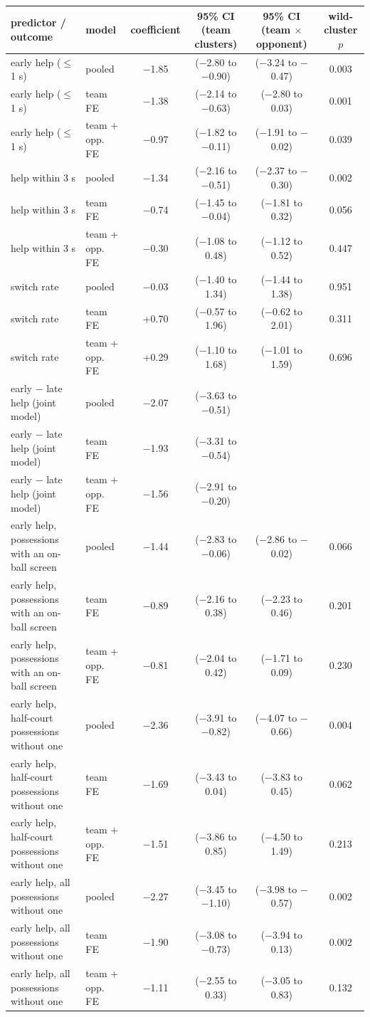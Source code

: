 \begin{tabular}{llcccc}
\hline
predictor / outcome & model & coefficient & 95\% CI (team clusters) & 95\% CI (team $\times$ opponent) & wild-cluster $p$ \\
\hline
early help ($\leq$ 1 s) & pooled & $-$1.85 & ($-$2.80 to $-$0.90) & ($-$3.24 to $-$0.47) & 0.003 \\
early help ($\leq$ 1 s) & team FE & $-$1.38 & ($-$2.14 to $-$0.63) & ($-$2.80 to 0.03) & 0.001 \\
early help ($\leq$ 1 s) & team + opp. FE & $-$0.97 & ($-$1.82 to $-$0.11) & ($-$1.91 to $-$0.02) & 0.039 \\
help within 3 s & pooled & $-$1.34 & ($-$2.16 to $-$0.51) & ($-$2.37 to $-$0.30) & 0.002 \\
help within 3 s & team FE & $-$0.74 & ($-$1.45 to $-$0.04) & ($-$1.81 to 0.32) & 0.056 \\
help within 3 s & team + opp. FE & $-$0.30 & ($-$1.08 to 0.48) & ($-$1.12 to 0.52) & 0.447 \\
switch rate & pooled & $-$0.03 & ($-$1.40 to 1.34) & ($-$1.44 to 1.38) & 0.951 \\
switch rate & team FE & +0.70 & ($-$0.57 to 1.96) & ($-$0.62 to 2.01) & 0.311 \\
switch rate & team + opp. FE & +0.29 & ($-$1.10 to 1.68) & ($-$1.01 to 1.59) & 0.696 \\
early $-$ late help (joint model) & pooled & $-$2.07 & ($-$3.63 to $-$0.51) & &  \\
early $-$ late help (joint model) & team FE & $-$1.93 & ($-$3.31 to $-$0.54) & &  \\
early $-$ late help (joint model) & team + opp. FE & $-$1.56 & ($-$2.91 to $-$0.20) & &  \\
early help, possessions with an on-ball screen & pooled & $-$1.44 & ($-$2.83 to $-$0.06) & ($-$2.86 to $-$0.02) & 0.066 \\
early help, possessions with an on-ball screen & team FE & $-$0.89 & ($-$2.16 to 0.38) & ($-$2.23 to 0.46) & 0.201 \\
early help, possessions with an on-ball screen & team + opp. FE & $-$0.81 & ($-$2.04 to 0.42) & ($-$1.71 to 0.09) & 0.230 \\
early help, half-court possessions without one & pooled & $-$2.36 & ($-$3.91 to $-$0.82) & ($-$4.07 to $-$0.66) & 0.004 \\
early help, half-court possessions without one & team FE & $-$1.69 & ($-$3.43 to 0.04) & ($-$3.83 to 0.45) & 0.062 \\
early help, half-court possessions without one & team + opp. FE & $-$1.51 & ($-$3.86 to 0.85) & ($-$4.50 to 1.49) & 0.213 \\
early help, all possessions without one & pooled & $-$2.27 & ($-$3.45 to $-$1.10) & ($-$3.98 to $-$0.57) & 0.002 \\
early help, all possessions without one & team FE & $-$1.90 & ($-$3.08 to $-$0.73) & ($-$3.94 to 0.13) & 0.002 \\
early help, all possessions without one & team + opp. FE & $-$1.11 & ($-$2.55 to 0.33) & ($-$3.05 to 0.83) & 0.132 \\
\hline
\end{tabular}
\par{}
